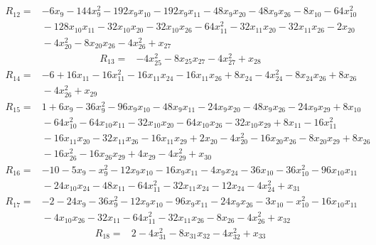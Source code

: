 \begin{align*}
R_{12}={}& -6x_{9} - 144x_{9}^{2} - 192x_{9}x_{10} - 192x_{9}x_{11} - 48x_{9}x_{20} - 48x_{9}x_{26} - 8x_{10} - 64x_{10}^{2} \\
&{} - 128x_{10}x_{11} - 32x_{10}x_{20} - 32x_{10}x_{26} - 64x_{11}^{2} - 32x_{11}x_{20} - 32x_{11}x_{26} - 2x_{20} \\
&{} - 4x_{20}^{2} - 8x_{20}x_{26} - 4x_{26}^{2} + x_{27}
\end{align*}
\begin{align*}
R_{13}={}& -4x_{25}^{2} - 8x_{25}x_{27} - 4x_{27}^{2} + x_{28}
\end{align*}
\begin{align*}
R_{14}={}& -6 + 16x_{11} - 16x_{11}^{2} - 16x_{11}x_{24} - 16x_{11}x_{26} + 8x_{24} - 4x_{24}^{2} - 8x_{24}x_{26} + 8x_{26} \\
&{} - 4x_{26}^{2} + x_{29}
\end{align*}
\begin{align*}
R_{15}={}& 1 + 6x_{9} - 36x_{9}^{2} - 96x_{9}x_{10} - 48x_{9}x_{11} - 24x_{9}x_{20} - 48x_{9}x_{26} - 24x_{9}x_{29} + 8x_{10} \\
&{} - 64x_{10}^{2} - 64x_{10}x_{11} - 32x_{10}x_{20} - 64x_{10}x_{26} - 32x_{10}x_{29} + 8x_{11} - 16x_{11}^{2} \\
&{} - 16x_{11}x_{20} - 32x_{11}x_{26} - 16x_{11}x_{29} + 2x_{20} - 4x_{20}^{2} - 16x_{20}x_{26} - 8x_{20}x_{29} + 8x_{26} \\
&{} - 16x_{26}^{2} - 16x_{26}x_{29} + 4x_{29} - 4x_{29}^{2} + x_{30}
\end{align*}
\begin{align*}
R_{16}={}& -10 - 5x_{9} - x_{9}^{2} - 12x_{9}x_{10} - 16x_{9}x_{11} - 4x_{9}x_{24} - 36x_{10} - 36x_{10}^{2} - 96x_{10}x_{11} \\
&{} - 24x_{10}x_{24} - 48x_{11} - 64x_{11}^{2} - 32x_{11}x_{24} - 12x_{24} - 4x_{24}^{2} + x_{31}
\end{align*}
\begin{align*}
R_{17}={}& -2 - 24x_{9} - 36x_{9}^{2} - 12x_{9}x_{10} - 96x_{9}x_{11} - 24x_{9}x_{26} - 3x_{10} - x_{10}^{2} - 16x_{10}x_{11} \\
&{} - 4x_{10}x_{26} - 32x_{11} - 64x_{11}^{2} - 32x_{11}x_{26} - 8x_{26} - 4x_{26}^{2} + x_{32}
\end{align*}
\begin{align*}
R_{18}={}& 2 - 4x_{31}^{2} - 8x_{31}x_{32} - 4x_{32}^{2} + x_{33}
\end{align*}
